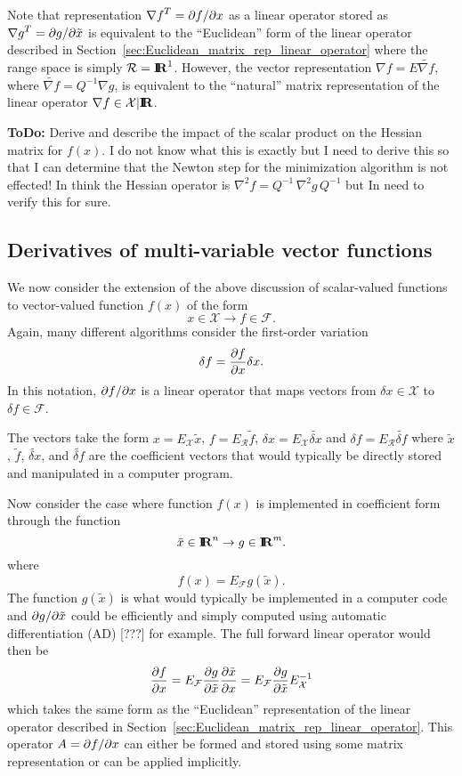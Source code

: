 \documentclass[pdf,ps2pdf,11pt]{SANDreport}
\begin{document}
Note that representation ${\nabla f}^T = {}\partial f / \partial x$ as a linear operator
stored as ${\nabla g}^T = {}\partial g / \partial \tilde{x}$ is equivalent to the
``Euclidean'' form of the linear operator described in
Section~\ref{sec:Euclidean_matrix_rep_linear_operator} where the range space
is simply $\mathcal{R}=\mbox{\textbf{I}}\hspace{-0.6ex}\mbox{\textbf{R}}^1$.  However, the vector representation $\nabla f =
E {}\tilde{\nabla f}$, where $\tilde{\nabla f} = {Q}^{-1}
{}\nabla g$, is equivalent to the ``natural'' matrix representation of the
linear operator $\nabla f\in\mathcal{X}|\mbox{\textbf{I}}\hspace{-0.6ex}\mbox{\textbf{R}}$.

{}\textbf{ToDo:} Derive and describe the impact of the scalar product on the
Hessian matrix for $f(x)$.  I do not know what this is exactly but I need to
derive this so that I can determine that the Newton step for the minimization
algorithm is not effected!  In think the Hessian operator is $\nabla^2 f =
Q^{-1} {}\, {}\nabla^2 g {}\, Q^{-1}$ but In need to verify this for sure.

\subsection{Derivatives of multi-variable vector functions}
\label{sec:vector_function_derivatives}

We now consider the extension of the above discussion of scalar-valued
functions to vector-valued function $f(x)$ of the form
\[
x\in\mathcal{X} \rightarrow f\in\mathcal{F}.
\]
Again, many different algorithms consider the first-order variation
\[
\delta f = \displaystyle{\frac{\partial f}{\partial x}} \delta x.
\]
In this notation, $\partial f / \partial x$ is a linear operator that maps vectors from
$\delta x\in\mathcal{X}$ to $\delta f\in\mathcal{F}$.

The vectors take the form $x = E_{\mathcal{X}} {}\tilde{x}$, $f =
E_{\mathcal{R}} {}\tilde{f}$, $\delta x = E_{\mathcal{X}} {}\tilde{\delta x}$
and $\delta f = E_{\mathcal{R}} {}\tilde{\delta f}$ where ${}\tilde{x}$,
${}\tilde{f}$, ${}\tilde{\delta x}$, and ${}\tilde{\delta f}$ are the
coefficient vectors that would typically be directly stored and manipulated in
a computer program.

Now consider the case where function $f(x)$ is implemented in coefficient form
through the function
%
\[
\tilde{x}\in\mbox{\textbf{I}}\hspace{-0.6ex}\mbox{\textbf{R}}^n \rightarrow g\in\mbox{\textbf{I}}\hspace{-0.6ex}\mbox{\textbf{R}}^m.
\]
%
where
%
\[
f(x) = E_{\mathcal{F}} g(\tilde{x}).
\]
%
The function $g(\tilde{x})$ is what would typically be implemented in a
computer code and $\partial g / \partial \tilde{x}$ could be efficiently and simply
computed using automatic differentiation (AD) [???] for example.  The full
forward linear operator would then be
%
\begin{equation}
\displaystyle{\frac{\partial f}{\partial x}} = E_{\mathcal{F}} \displaystyle{\frac{\partial g}{\partial \tilde{x}}} \displaystyle{\frac{\partial \tilde{x}}{\partial x}}  = E_{\mathcal{F}} \displaystyle{\frac{\partial g}{\partial \tilde{x}}} E_{\mathcal{X}}^{-1}
\label{eqn:d_f_d_x_Euclidean}
\end{equation}
%
which takes the same form as the ``Euclidean'' representation of the linear
operator described in Section~\ref{sec:Euclidean_matrix_rep_linear_operator}.
This operator $A = \partial f / \partial x$ can either be formed and stored using some
matrix representation or can be applied implicitly.
\end{document}
